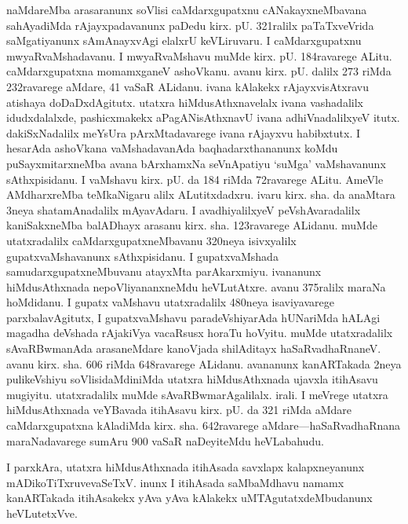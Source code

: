 \documentclass[11pt,a4size]{article}
\begin{document}
naMdareMba arasaranunx soVlisi caMdarxgupatxnu cANakayxneMbavana
sahAyadiMda rAjayxpadavanunx paDedu kirx. pU. 321ralilx paTaTxveVrida
saMgatiyanunx sAmAnayxvAgi elalxrU keVLiruvaru. I caMdarxgupatxnu
mwyaRvaMshadavanu. I mwyaRvaMshavu muMde kirx. pU. 184ravarege
ALitu. caMdarxgupatxna momamxganeV ashoVkanu. avanu kirx. pU. dalilx
273 riMda 232ravarege aMdare, 41 vaSaR ALidanu. ivana kAlakekx
rAjayxvisAtxravu atishaya doDaDxdAgitutx. utatxra hiMdusAthxnavelalx
ivana vashadalilx idudxdalalxde, pashicxmakekx aPagANisAthxnavU ivana
adhiVnadalilxyeV itutx. dakiSxNadalilx meYsUra pArxMtadavarege ivana
rAjayxvu habibxtutx. I hesarAda ashoVkana vaMshadavanAda
baqhadarxthananunx koMdu puSayxmitarxneMba avana bArxhamxNa
seVnApatiyu `suMga' vaMshavanunx sAthxpisidanu. I vaMshavu
kirx. pU. da 184 riMda 72ravarege ALitu. AmeVle AMdharxreMba
teMkaNigaru alilx ALutitxdadxru. ivaru kirx. sha. da anaMtara 3neya
shatamAnadalilx mAyavAdaru. I avadhiyalilxyeV peVshAvaradalilx
kaniSakxneMba balADhayx arasanu kirx. sha. 123ravarege ALidanu. muMde
utatxradalilx caMdarxgupatxneMbavanu 320neya isivxyalilx
gupatxvaMshavanunx sAthxpisidanu. I gupatxvaMshada
samudarxgupatxneMbuvanu atayxMta parAkarxmiyu. ivananunx
hiMdusAthxnada nepoVliyananxneMdu heVLutAtxre. avanu 375ralilx maraNa
hoMdidanu. I gupatx vaMshavu utatxradalilx 480neya isaviyavarege
parxbalavAgitutx, I gupatxvaMshavu paradeVshiyarAda hUNariMda hALAgi
magadha deVshada rAjakiVya vacaRsusx horaTu hoVyitu. muMde
utatxradalilx sAvaRBwmanAda arasaneMdare kanoVjada shilAditayx
haSaRvadhaRnaneV. avanu kirx. sha. 606 riMda 648ravarege
ALidanu. avananunx kanARTakada 2neya pulikeVshiyu soVlisidaMdiniMda
utatxra hiMdusAthxnada ujavxla itihAsavu mugiyitu. utatxradalilx muMde
sAvaRBwmarAgalilalx. irali. I meVrege utatxra hiMdusAthxnada veYBavada
itihAsavu kirx. pU. da 321 riMda aMdare caMdarxgupatxna kAladiMda
kirx. sha. 642ravarege aMdare---haSaRvadhaRnana maraNadavarege sumAru
900 vaSaR naDeyiteMdu heVLabahudu.

I parxkAra, utatxra hiMdusAthxnada itihAsada savxlapx kalapxneyanunx
mADikoTiTxruvevaSeTxV. inunx I itihAsada saMbaMdhavu namamx
kanARTakada itihAsakekx yAva yAva kAlakekx uMTAgutatxdeMbudanunx
heVLutetxVve.
\end{document}
